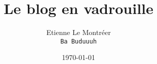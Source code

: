 \documentclass[a5paper, 10pt]{book}
\begin{document}
\frontmatter
\title{Le blog en vadrouille}
\author{Etienne Le Montr\'eer\\
\texttt{Ba Buduuuh}}
\date{\today}

\maketitle

\tableofcontents

\mainmatter

%

%
\pagebreak

%
%
\end{document}
